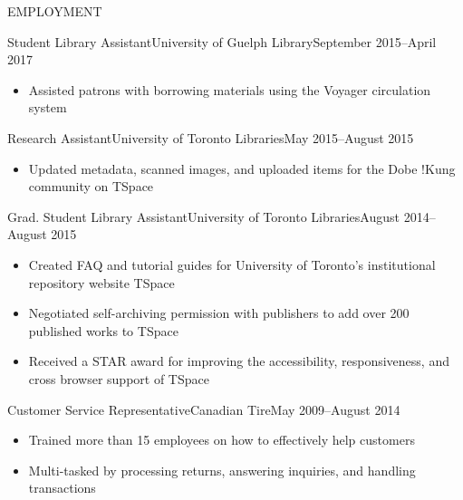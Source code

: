\documentclass[]{mcdowellcv}
\begin{document}
	\makeheader
	
	\begin{cvsection}{EMPLOYMENT}
		\begin{cvsubsection}{Student Library Assistant}{University of Guelph Library}{September 2015--April 2017}
			\begin{itemize}
				\item Assisted patrons with borrowing materials using the Voyager circulation system
			\end{itemize}
		\end{cvsubsection}
		
		\begin{cvsubsection}{Research Assistant}{University of Toronto Libraries}{May 2015--August 2015}	
			\begin{itemize}
				\item Updated metadata, scanned images, and uploaded items for the Dobe !Kung community on TSpace
			\end{itemize}
		\end{cvsubsection}
		
		\begin{cvsubsection}{Grad. Student Library Assistant}{University of Toronto Libraries}{August 2014--August 2015}		
			\begin{itemize}
	    	\item Created FAQ and tutorial guides for University of Toronto's institutional repository website TSpace
        \item Negotiated self-archiving permission with publishers to add over 200 published works to TSpace
        \item Received a STAR award for improving the accessibility, responsiveness, and cross browser support of TSpace 
			\end{itemize}
		\end{cvsubsection}
		
		\begin{cvsubsection}{Customer Service Representative}{Canadian Tire}{May 2009--August 2014}
			\begin{itemize}
				\item Trained more than 15 employees on how to effectively help customers
        \item Multi-tasked by processing returns, answering inquiries, and handling transactions
			\end{itemize}
		\end{cvsubsection}
	\end{cvsection}
\end{document}
